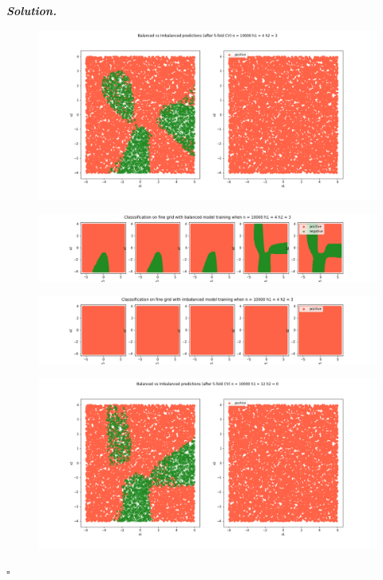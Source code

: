 \documentclass[10pt]{article}
\newenvironment{solution}[1][\it{Solution}]{\textbf{#1. } }{$\square$}
\begin{document}
\begin{solution}
\begin{figure}[H]
\end{figure}
\begin{figure}[H]
\includegraphics[width=16cm, keepaspectratio]{./3/46}
\end{figure}
\begin{figure}[H]
\includegraphics[width=16cm, keepaspectratio]{./3/47}
\end{figure}
\begin{figure}[H]
\includegraphics[width=16cm, keepaspectratio]{./3/48}
\end{figure}
\begin{figure}[H]
\includegraphics[width=16cm, keepaspectratio]{./3/49}
\end{figure}

\end{solution}
\end{document}
